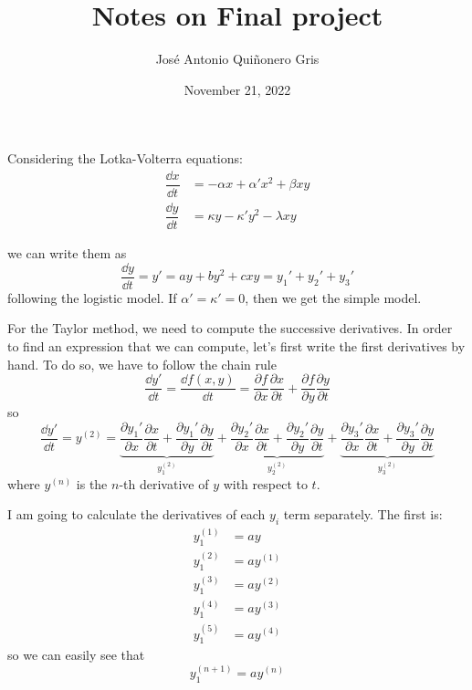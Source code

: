\documentclass[12pt, a4paper]{article}
\author{José Antonio Quiñonero Gris}
\title{
    \textbf{Notes on Final project}
      }
\date{
November 21, 2022
}
\begin{document}
\maketitle


Considering the Lotka-Volterra equations:
\begin{align}
    \dfrac{\dd{x}}{\dd{t}} &= - \alpha x + \alpha' x^2 + \beta x y \\
    \dfrac{\dd{y}}{\dd{t}} &= \kappa y - \kappa' y^2 - \lambda x y
\end{align}

we can write them as
\begin{equation}\label{ec:main}
    \dfrac{\dd{y}}{\dd{t}} = y' = a y + b y^2 + c x y = y_1' + y_2' + y_3'
\end{equation}
following the logistic model. If $\alpha' = \kappa' = 0$, then we get the simple model.

For the Taylor method, we need to compute the successive derivatives. In order to find an expression that we can compute, let's first write the first derivatives by hand. To do so, we have to follow the chain rule
\begin{equation}
    \dfrac{ \dd{y'} }{\dd{t}} = \dfrac{\dd{f(x,y)}}{\dd{t}} = \frac{\partial f}{\partial x} \frac{\partial x}{\partial t} + \frac{\partial f}{\partial y} \frac{\partial y}{\partial t}
\end{equation}
so
\begin{equation}
    \dfrac{ \dd{y'} }{\dd{t}} = y^{(2)} =
    \underbrace{\frac{\partial y_1'}{\partial x} \frac{\partial x}{\partial t} + \frac{\partial y_1'}{\partial y} \frac{\partial y}{\partial t}}_{y_1^{(2)}} +
    \underbrace{\frac{\partial y_2'}{\partial x} \frac{\partial x}{\partial t} + \frac{\partial y_2'}{\partial y} \frac{\partial y}{\partial t}}_{y_2^{(2)}} +
    \underbrace{\frac{\partial y_3'}{\partial x} \frac{\partial x}{\partial t} + \frac{\partial y_3'}{\partial y} \frac{\partial y}{\partial t}}_{y_3^{(2)}}
\end{equation}
where $y^{(n)}$ is the $n$-th derivative of $y$ with respect to $t$.

I am going to calculate the derivatives of each $y_i$ term separately. The first is:
\begin{align*}
    y_1^{(1)} &= ay \\
    y_1^{(2)} &= ay^{(1)} \\
    y_1^{(3)} &= ay^{(2)} \\
    y_1^{(4)} &= ay^{(3)} \\
    y_1^{(5)} &= ay^{(4)}
\end{align*}
so we can easily see that
\begin{equation}\label{ec:primer_termino}
    y_1^{(n+1)} = a y^{(n)}
\end{equation}
\end{document}
